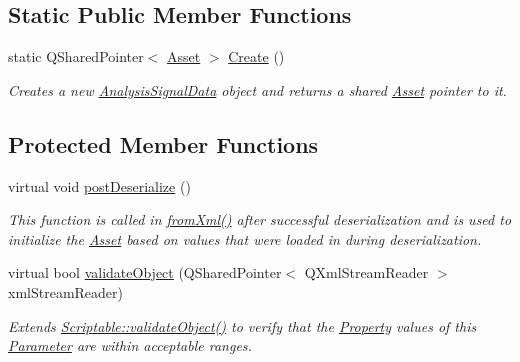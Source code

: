 \subsection*{Static Public Member Functions}
\begin{DoxyCompactItemize}
\item 
\hypertarget{class_picto_1_1_analysis_signal_data_a5204ea8d33fe8e11c1b31eab5d9f11b0}{static Q\-Shared\-Pointer$<$ \hyperlink{class_picto_1_1_asset}{Asset} $>$ \hyperlink{class_picto_1_1_analysis_signal_data_a5204ea8d33fe8e11c1b31eab5d9f11b0}{Create} ()}\label{class_picto_1_1_analysis_signal_data_a5204ea8d33fe8e11c1b31eab5d9f11b0}

\begin{DoxyCompactList}\small\item\em Creates a new \hyperlink{class_picto_1_1_analysis_signal_data}{Analysis\-Signal\-Data} object and returns a shared \hyperlink{class_picto_1_1_asset}{Asset} pointer to it. \end{DoxyCompactList}\end{DoxyCompactItemize}
\subsection*{Protected Member Functions}
\begin{DoxyCompactItemize}
\item 
virtual void \hyperlink{class_picto_1_1_analysis_signal_data_a104001f38f5ba6c27ea844a96cc7a1d9}{post\-Deserialize} ()
\begin{DoxyCompactList}\small\item\em This function is called in \hyperlink{class_picto_1_1_asset_a8bed4da09ecb1c07ce0dab313a9aba67}{from\-Xml()} after successful deserialization and is used to initialize the \hyperlink{class_picto_1_1_asset}{Asset} based on values that were loaded in during deserialization. \end{DoxyCompactList}\item 
virtual bool \hyperlink{class_picto_1_1_analysis_signal_data_a1e2a5e3c64e9b456e5074baec23e0cf6}{validate\-Object} (Q\-Shared\-Pointer$<$ Q\-Xml\-Stream\-Reader $>$ xml\-Stream\-Reader)
\begin{DoxyCompactList}\small\item\em Extends \hyperlink{class_picto_1_1_scriptable_ab6e2944c43a3b5d418bf7b251594386d}{Scriptable\-::validate\-Object()} to verify that the \hyperlink{class_picto_1_1_property}{Property} values of this \hyperlink{class_picto_1_1_parameter}{Parameter} are within acceptable ranges. \end{DoxyCompactList}\end{DoxyCompactItemize}
